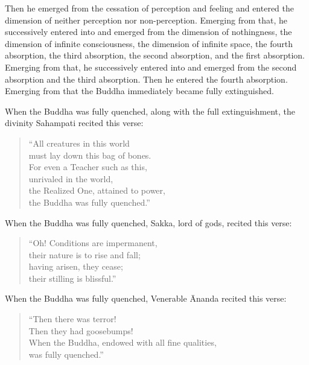 \documentclass[12pt,openany]{book}%
\begin{document}
Then he emerged from the cessation of perception and feeling and entered the dimension of neither perception nor non-perception. Emerging from that, he successively entered into and emerged from the dimension of nothingness, the dimension of infinite consciousness, the dimension of infinite space, the fourth absorption, the third absorption, the second absorption, and the first absorption. Emerging from that, he successively entered into and emerged from the second absorption and the third absorption. Then he entered the fourth absorption. Emerging from that the Buddha immediately became fully extinguished. 

When the Buddha was fully quenched, along with the full extinguishment, the divinity Sahampati recited this verse: 

\begin{verse}%
“All creatures in this world \\
must lay down this bag of bones. \\
For even a Teacher such as this, \\
unrivaled in the world, \\
the Realized One, attained to power, \\
the Buddha was fully quenched.” 

%
\end{verse}

When the Buddha was fully quenched, Sakka, lord of gods, recited this verse: 

\begin{verse}%
“Oh! Conditions are impermanent, \\
their nature is to rise and fall; \\
having arisen, they cease; \\
their stilling is blissful.” 

%
\end{verse}

When the Buddha was fully quenched, Venerable Ānanda recited this verse: 

\begin{verse}%
“Then there was terror! \\
Then they had goosebumps! \\
When the Buddha, endowed with all fine qualities, \\
was fully quenched.” 

%
\end{verse}
\end{document}
